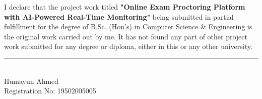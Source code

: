 I declare that the project work titled \textbf{"Online Exam Proctoring Platform with AI-Powered Real-Time Monitoring"} being submitted in partial fulfillment for the degree of B.Sc. (Hon's) in Computer Science \& Engineering is the original work carried out by me. It has not found any part of other project work submitted for any degree or diploma, either in this or any other university.

\vspace{1in}


\noindent   \rule{5.4cm}{1pt} \\
   Humayun Ahmed \\
   Registration No: 19502005005

